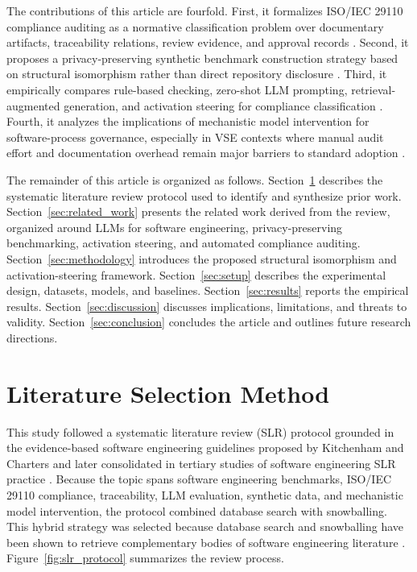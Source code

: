 \documentclass{ieeeaccess}
\begin{document}
The contributions of this article are fourfold. First, it formalizes ISO/IEC 29110 compliance auditing as a normative classification problem over documentary artifacts, traceability relations, review evidence, and approval records \cite{iso29110_2024,terronmacias,11276002}. Second, it proposes a privacy-preserving synthetic benchmark construction strategy based on structural isomorphism rather than direct repository disclosure \cite{bauer2024syntheticdata,dwork2006differentialprivacy,mcmahan2017communication}. Third, it empirically compares rule-based checking, zero-shot LLM prompting, retrieval-augmented generation, and activation steering for compliance classification \cite{castellanos2022processcompliance,fuchss2025lissa,zou2023representation,turner2023activation}. Fourth, it analyzes the implications of mechanistic model intervention for software-process governance, especially in VSE contexts where manual audit effort and documentation overhead remain major barriers to standard adoption \cite{laporte2016vse,munoz2020implementations,101145}.

The remainder of this article is organized as follows. Section~\ref{sec:slr_methodology} describes the systematic literature review protocol used to identify and synthesize prior work. Section~\ref{sec:related_work} presents the related work derived from the review, organized around LLMs for software engineering, privacy-preserving benchmarking, activation steering, and automated compliance auditing. Section~\ref{sec:methodology} introduces the proposed structural isomorphism and activation-steering framework. Section~\ref{sec:setup} describes the experimental design, datasets, models, and baselines. Section~\ref{sec:results} reports the empirical results. Section~\ref{sec:discussion} discusses implications, limitations, and threats to validity. Section~\ref{sec:conclusion} concludes the article and outlines future research directions.

\section{Literature Selection Method}
\label{sec:slr_methodology}

This study followed a systematic literature review (SLR) protocol grounded in the evidence-based software engineering guidelines proposed by Kitchenham and Charters and later consolidated in tertiary studies of software engineering SLR practice \cite{kitchenham2007guidelines,kitchenham2010tertiary}. Because the topic spans software engineering benchmarks, ISO/IEC 29110 compliance, traceability, LLM evaluation, synthetic data, and mechanistic model intervention, the protocol combined database search with snowballing. This hybrid strategy was selected because database search and snowballing have been shown to retrieve complementary bodies of software engineering literature \cite{jalali2012database,wohlin2014snowballing,wohlin2022hybrid}. Figure~\ref{fig:slr_protocol} summarizes the review process.
\end{document}
